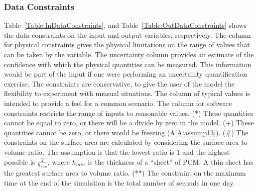 \documentclass[12pt]{article}
\begin{document}
\subsubsection{Data Constraints}
\label{Sec:DataConstraints}
Table~\ref{Table:InDataConstraints}, and Table~\ref{Table:OutDataConstraints} shows the data constraints on the input and output variables, respectively. The column for physical constraints gives the physical limitations on the range of values that can be taken by the variable. The uncertainty column provides an estimate of the confidence with which the physical quantities can be measured. This information would be part of the input if one were performing an uncertainty quantification exercise. The constraints are conservative, to give the user of the model the flexibility to experiment with unusual situations. The column of typical values is intended to provide a feel for a common scenario. The column for software constraints restricts the range of inputs to reasonable values. (*) These quantities cannot be equal to zero, or there will be a divide by zero in the model. (+) These quantities cannot be zero, or there would be freezing (A\ref{A:assump13}). (\#) The constraints on the surface area are calculated by considering the surface area to volume ratio. The assumption is that the lowest ratio is 1 and the highest possible is $\frac{2}{{h_{min}}}$, where ${h_{min}}$ is the thickness of a ``sheet'' of PCM. A thin sheet has the greatest surface area to volume ratio. (**) The constraint on the maximum time at the end of the simulation is the total number of seconds in one day.
\end{document}
